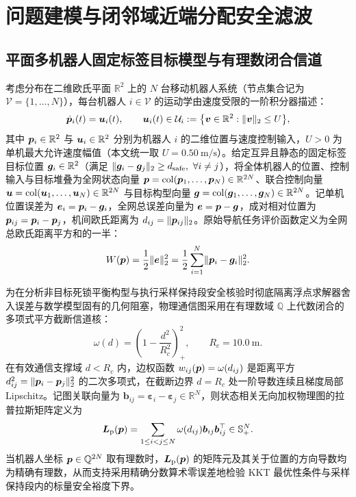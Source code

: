 \section{问题建模与闭邻域近端分配安全滤波}\label{sec:model}

\subsection{平面多机器人固定标签目标模型与有理数闭合信道}
考虑分布在二维欧氏平面 $\mathbb R^2$ 上的 $N$ 台移动机器人系统（节点集合记为 $\mathcal V=\{1,\dots,N\}$），每台机器人 $i\in\mathcal V$ 的运动学由速度受限的一阶积分器描述：
\begin{equation}
 \dot{\boldsymbol{p}}_i(t)=\boldsymbol{u}_i(t),\qquad \boldsymbol{u}_i(t)\in\mathcal U_i:=\big\{\boldsymbol v\in\mathbb R^2:\lVert\boldsymbol v\rVert_2\le U\big\},
 \label{eq:kinematics}
\end{equation}
其中 $\boldsymbol{p}_i\in\mathbb R^2$ 与 $\boldsymbol{u}_i\in\mathbb R^2$ 分别为机器人 $i$ 的二维位置与速度控制输入，$U>0$ 为单机最大允许速度幅值（本文统一取 $U=0.50\ \mathrm{m/s}$）。给定互异且静态的固定标签目标位置 $\boldsymbol{g}_i\in\mathbb R^2$（满足 $\lVert\boldsymbol{g}_i-\boldsymbol{g}_j\rVert_2\ge d_{\mathrm{safe}},\ \forall i\ne j$），将全体机器人的位置、控制输入与目标堆叠为全网状态向量 $\boldsymbol{p}=\operatorname{col}(\boldsymbol{p}_1,\dots,\boldsymbol{p}_N)\in\mathbb R^{2N}$、联合控制向量 $\boldsymbol{u}=\operatorname{col}(\boldsymbol{u}_1,\dots,\boldsymbol{u}_N)\in\mathbb R^{2N}$ 与目标构型向量 $\boldsymbol{g}=\operatorname{col}(\boldsymbol{g}_1,\dots,\boldsymbol{g}_N)\in\mathbb R^{2N}$。记单机位置误差为 $\boldsymbol{e}_i=\boldsymbol{p}_i-\boldsymbol{g}_i$，全网总误差向量为 $\boldsymbol{e}=\boldsymbol{p}-\boldsymbol{g}$，成对相对位置为 $\boldsymbol{p}_{ij}=\boldsymbol{p}_i-\boldsymbol{p}_j$，机间欧氏距离为 $d_{ij}=\lVert\boldsymbol{p}_{ij}\rVert_2$。原始导航任务评价函数定义为全网总欧氏距离平方和的一半：
\begin{equation}
 W(\boldsymbol{p})=\frac12\lVert\boldsymbol{e}\rVert_2^2=\frac12\sum_{i=1}^N\lVert\boldsymbol{p}_i-\boldsymbol{g}_i\rVert_2^2.
 \label{eq:W-def}
\end{equation}

为在分析非目标死锁平衡构型与执行采样保持段安全核验时彻底隔离浮点求解器舍入误差与数学模型固有的几何阻塞，物理通信图采用在有理数域 $\mathbb Q$ 上代数闭合的多项式平方截断信道核：
\begin{equation}
 \omega(d)=\left(1-\frac{d^2}{R_c^2}\right)_+^2,\qquad R_c=10.0\ \mathrm m.
 \label{eq:poly-channel}
\end{equation}
在有效通信支撑域 $d<R_c$ 内，边权函数 $w_{ij}(\boldsymbol{p})=\omega(d_{ij})$ 是距离平方 $d_{ij}^2=\lVert\boldsymbol{p}_i-\boldsymbol{p}_j\rVert_2^2$ 的二次多项式，在截断边界 $d=R_c$ 处一阶导数连续且梯度局部 Lipschitz。记图关联向量为 $\boldsymbol b_{ij}=\boldsymbol\varepsilon_i-\boldsymbol\varepsilon_j\in\mathbb R^N$，则状态相关无向加权物理图的拉普拉斯矩阵定义为
\begin{equation}
 \boldsymbol{L}_{\mathrm{p}}(\boldsymbol{p})=\sum_{1\le i<j\le N}\omega(d_{ij})\boldsymbol b_{ij}\boldsymbol b_{ij}^{\top}\in\mathbb S_+^N.
 \label{eq:laplacian}
\end{equation}
当机器人坐标 $\boldsymbol{p}\in\mathbb Q^{2N}$ 取有理数时，$\boldsymbol{L}_{\mathrm{p}}(\boldsymbol{p})$ 的矩阵元及其关于位置的方向导数均为精确有理数，从而支持采用精确分数算术零误差地检验 KKT 最优性条件与采样保持段内的标量安全裕度下界。

